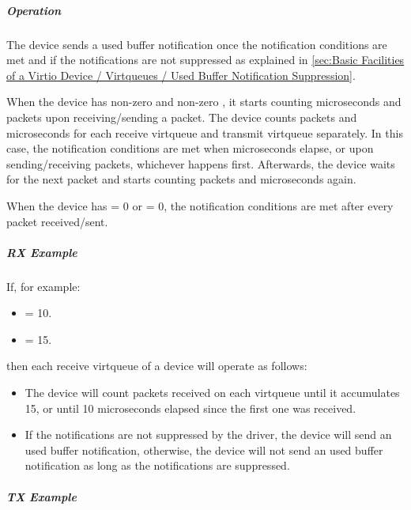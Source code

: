 \subparagraph{Operation}\label{sec:Device Types / Network Device / Device Operation / Control Virtqueue / Notifications Coalescing / Operation}

The device sends a used buffer notification once the notification conditions are met and if the notifications are not suppressed as explained in \ref{sec:Basic Facilities of a Virtio Device / Virtqueues / Used Buffer Notification Suppression}.

When the device has non-zero  and non-zero , it starts counting microseconds and packets upon receiving/sending a packet.
The device counts packets and microseconds for each receive virtqueue and transmit virtqueue separately.
In this case, the notification conditions are met when  microseconds elapse, or upon sending/receiving  packets, whichever happens first.
Afterwards, the device waits for the next packet and starts counting packets and microseconds again.

When the device has  = 0 or  = 0, the notification conditions are met after every packet received/sent.

\subparagraph{RX Example}\label{sec:Device Types / Network Device / Device Operation / Control Virtqueue / Notifications Coalescing / RX Example}

If, for example:
\begin{itemize}
\item {} = 10.
\item {} = 15.
\end{itemize}
then each receive virtqueue of a device will operate as follows:
\begin{itemize}
\item The device will count packets received on each virtqueue until it accumulates 15, or until 10 microseconds elapsed since the first one was received.
\item If the notifications are not suppressed by the driver, the device will send an used buffer notification, otherwise, the device will not send an used buffer notification as long as the notifications are suppressed.
\end{itemize}

\subparagraph{TX Example}\label{sec:Device Types / Network Device / Device Operation / Control Virtqueue / Notifications Coalescing / TX Example}

